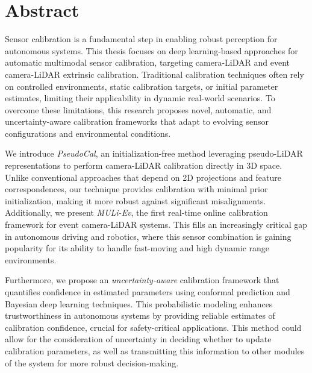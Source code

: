 \begingroup
\let\clearpage\relax
\let\cleardoublepage\relax
\let\cleardoublepage\relax

\chapter*{Abstract}

Sensor calibration is a fundamental step in enabling robust perception for
autonomous systems. This thesis focuses on deep learning-based approaches for
automatic multimodal sensor calibration, targeting camera-LiDAR and event
camera-LiDAR extrinsic calibration. Traditional calibration techniques often
rely on controlled environments, static calibration targets, or initial
parameter estimates, limiting their applicability in dynamic real-world
scenarios. To overcome these limitations, this research proposes novel,
automatic, and uncertainty-aware calibration frameworks that adapt to evolving
sensor configurations and environmental conditions.

We introduce \textit{PseudoCal}, an initialization-free method leveraging
pseudo-LiDAR representations to perform camera-LiDAR calibration directly in 3D
space. Unlike conventional approaches that depend on 2D projections and feature
correspondences, our technique provides calibration with minimal prior
initialization, making it more robust against significant misalignments.
Additionally, we present \textit{MULi-Ev}, the first real-time online
calibration framework for event camera-LiDAR systems. This fills an
increasingly critical gap in autonomous driving and robotics, where this sensor
combination is gaining popularity for its ability to handle fast-moving and
high dynamic range environments.

Furthermore, we propose an \textit{uncertainty-aware} calibration framework
that quantifies confidence in estimated parameters using conformal prediction
and Bayesian deep learning techniques. This probabilistic modeling enhances
trustworthiness in autonomous systems by providing reliable estimates of
calibration confidence, crucial for safety-critical applications. This method
could allow for the consideration of uncertainty in deciding whether to update
calibration parameters, as well as transmitting this information to other
modules of the system for more robust decision-making.

